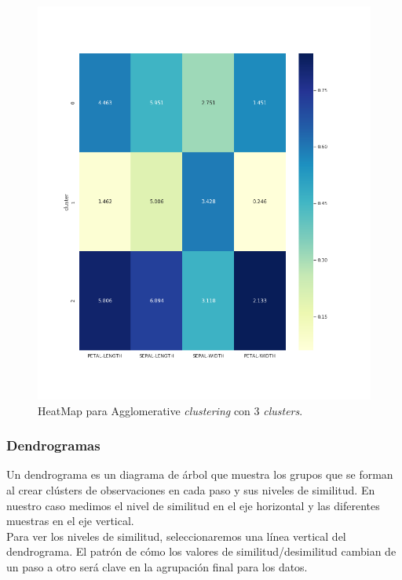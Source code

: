\documentclass[a4paper, 20pt]{article}
\begin{document}
\begin{figure}[h]
\centering
\includegraphics[scale=0.63]{dani/heatmapAggClusterIRIS.png}
\caption{HeatMap para Agglomerative \textit{clustering} con 3 \textit{clusters}.}
\label{hmac}
\end{figure}

\clearpage

\subsubsection{Dendrogramas}

Un dendrograma es un diagrama de árbol que muestra los grupos que se forman al crear clústers de observaciones en cada paso y sus niveles de similitud. En nuestro caso medimos el nivel de similitud en el eje horizontal y las diferentes muestras en el eje vertical.\\

Para ver los niveles de similitud, seleccionaremos una línea vertical del dendrograma. El patrón de cómo los valores de similitud/desimilitud cambian de un paso a otro será clave en la agrupación final para los datos.\\
\end{document}

